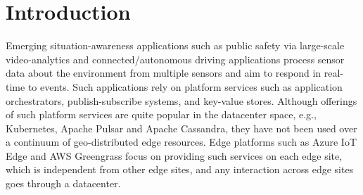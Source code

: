 \chapter{Introduction}
\label{sec:intro}
Emerging situation-awareness applications such as public safety via large-scale video-analytics and connected/autonomous driving applications process sensor data about the environment from multiple sensors and aim to respond in real-time to events. Such applications rely on platform services such as application orchestrators, publish-subscribe systems, and key-value stores. Although offerings of such platform services are quite popular in the datacenter space, e.g., Kubernetes, Apache Pulsar and Apache Cassandra, they have not been used over a continuum of geo-distributed edge resources. Edge platforms such as Azure IoT Edge and AWS Greengrass focus on providing such services on each edge site, which is independent from other edge sites, and any interaction across edge sites goes through a datacenter.
